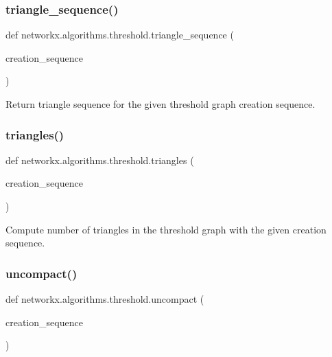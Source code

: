 \subsubsection{\texorpdfstring{triangle\+\_\+sequence()}{triangle\_sequence()}}
{\footnotesize\ttfamily def networkx.\+algorithms.\+threshold.\+triangle\+\_\+sequence (\begin{DoxyParamCaption}\item[{}]{creation\+\_\+sequence }\end{DoxyParamCaption})}

\begin{DoxyVerb}Return triangle sequence for the given threshold graph creation sequence.\end{DoxyVerb}
 \mbox{\label{namespacenetworkx_1_1algorithms_1_1threshold_a68f1353fc6cafd327fe4ff537357c5cf}} 
\subsubsection{\texorpdfstring{triangles()}{triangles()}}
{\footnotesize\ttfamily def networkx.\+algorithms.\+threshold.\+triangles (\begin{DoxyParamCaption}\item[{}]{creation\+\_\+sequence }\end{DoxyParamCaption})}

\begin{DoxyVerb}Compute number of triangles in the threshold graph with the
given creation sequence.
\end{DoxyVerb}
 \mbox{\label{namespacenetworkx_1_1algorithms_1_1threshold_a853782d9473275a93bcdc3c39d5ae2b4}} 
\subsubsection{\texorpdfstring{uncompact()}{uncompact()}}
{\footnotesize\ttfamily def networkx.\+algorithms.\+threshold.\+uncompact (\begin{DoxyParamCaption}\item[{}]{creation\+\_\+sequence }\end{DoxyParamCaption})}

